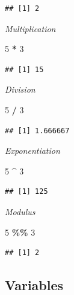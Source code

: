 \documentclass[
  b5paper]{book}
\newenvironment{Shaded}{\begin{snugshade}}{\end{snugshade}}
\newcommand{\DecValTok}[1]{\textcolor[rgb]{0.00,0.00,0.81}{#1}}
\newcommand{\SpecialCharTok}[1]{\textcolor[rgb]{0.81,0.36,0.00}{\textbf{#1}}}
\begin{document}
\begin{verbatim}
## [1] 2
\end{verbatim}

\emph{Multiplication}

\begin{Shaded}
\begin{Highlighting}[]
\DecValTok{5} \SpecialCharTok{*} \DecValTok{3}
\end{Highlighting}
\end{Shaded}

\begin{verbatim}
## [1] 15
\end{verbatim}

\emph{Division}

\begin{Shaded}
\begin{Highlighting}[]
\DecValTok{5} \SpecialCharTok{/} \DecValTok{3}
\end{Highlighting}
\end{Shaded}

\begin{verbatim}
## [1] 1.666667
\end{verbatim}

\emph{Exponentiation}

\begin{Shaded}
\begin{Highlighting}[]
\DecValTok{5} \SpecialCharTok{\^{}} \DecValTok{3}
\end{Highlighting}
\end{Shaded}

\begin{verbatim}
## [1] 125
\end{verbatim}

\emph{Modulus}

\begin{Shaded}
\begin{Highlighting}[]
\DecValTok{5} \SpecialCharTok{\%\%} \DecValTok{3}
\end{Highlighting}
\end{Shaded}

\begin{verbatim}
## [1] 2
\end{verbatim}

\hypertarget{variables}{%
\subsection*{Variables}\label{variables}}
\end{document}
